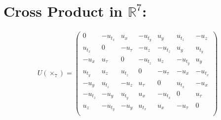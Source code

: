 \documentclass{article}
\begin{document}
\section*{Cross Product in $\mathbb{R}^7$:}
\begin{align*}
U(\times_{7}) =
\begin{pmatrix}
0 & -u_{t_x} & u_x & -u_{t_y} & u_y & u_{t_z} & -u_z \\[1mm]
u_{t_x} & 0 & -u_\tau & -u_z & -u_{t_z} & u_y & u_{t_y} \\[1mm]
-u_x & u_\tau & 0 & -u_{t_z} & u_z & -u_{t_y} & u_y \\[1mm]
u_{t_y} & u_z & u_{t_z} & 0 & -u_\tau & -u_x & -u_{t_x} \\[1mm]
-u_y & u_{t_z} & -u_z & u_\tau & 0 & u_{t_x} & -u_x \\[1mm]
-u_{t_z} & -u_y & u_{t_y} & u_x & -u_{t_x} & 0 & u_\tau \\[1mm]
u_z & -u_{t_y} & -u_y & u_{t_x} & u_x & -u_\tau & 0 \\[1mm]
\end{pmatrix}
\end{align*}
\end{document}

